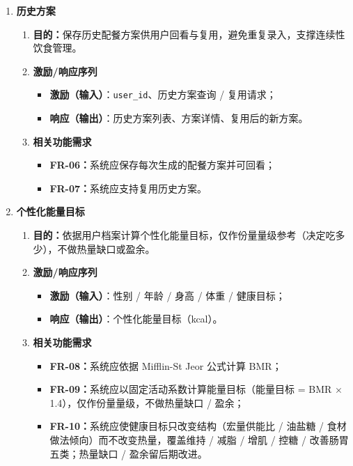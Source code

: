 \documentclass[12pt,a4paper]{ctexart}
\begin{document}
\begin{enumerate}
\item \textbf{历史方案}
  \begin{enumerate}[label=(\arabic*), leftmargin=10pt, itemsep=2pt, topsep=2pt]
    \item \textbf{目的：}保存历史配餐方案供用户回看与复用，避免重复录入，支撑连续性饮食管理。
    \item \textbf{激励/响应序列}
      \begin{itemize}[leftmargin=*, itemsep=1pt, topsep=1pt]
        \item \textbf{激励（输入）}：\texttt{user\_id}、历史方案查询 / 复用请求；
        \item \textbf{响应（输出）}：历史方案列表、方案详情、复用后的新方案。
      \end{itemize}
    \item \textbf{相关功能需求}
      \begin{itemize}[leftmargin=*, itemsep=1pt, topsep=1pt]
        \item \textbf{FR-06：}系统应保存每次生成的配餐方案并可回看；
        \item \textbf{FR-07：}系统应支持复用历史方案。
      \end{itemize}
  \end{enumerate}

\item \textbf{个性化能量目标}
  \begin{enumerate}[label=(\arabic*), leftmargin=10pt, itemsep=2pt, topsep=2pt]
    \item \textbf{目的：}依据用户档案计算个性化能量目标，仅作份量量级参考（决定吃多少），不做热量缺口或盈余。
    \item \textbf{激励/响应序列}
      \begin{itemize}[leftmargin=*, itemsep=1pt, topsep=1pt]
        \item \textbf{激励（输入）}：性别 / 年龄 / 身高 / 体重 / 健康目标；
        \item \textbf{响应（输出）}：个性化能量目标（kcal）。
      \end{itemize}
    \item \textbf{相关功能需求}
      \begin{itemize}[leftmargin=*, itemsep=1pt, topsep=1pt]
        \item \textbf{FR-08：}系统应依据 Mifflin-St Jeor 公式计算 BMR；
        \item \textbf{FR-09：}系统应以固定活动系数计算能量目标（能量目标 = BMR $\times$ 1.4），仅作份量量级，不做热量缺口 / 盈余；
        \item \textbf{FR-10：}系统应使健康目标只改变结构（宏量供能比 / 油盐糖 / 食材做法倾向）而不改变热量，覆盖维持 / 减脂 / 增肌 / 控糖 / 改善肠胃五类；热量缺口 / 盈余留后期改进。
      \end{itemize}
  \end{enumerate}


\end{enumerate}
\end{document}
